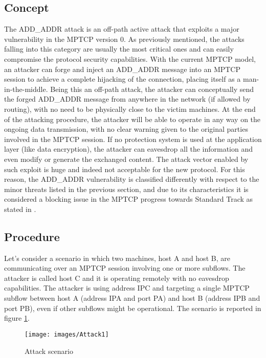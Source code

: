 \subsection{Concept}
The ADD\_ADDR attack is an off-path active attack that exploits a major vulnerability in the MPTCP version 0. As previously mentioned, the attacks falling into this category are usually the most critical ones and can easily compromise the protocol security capabilities.
With the current MPTCP model, an attacker can forge and inject an ADD\_ADDR message into an MPTCP session to achieve a complete hijacking of the connection, placing itself as a man-in-the-middle. Being this an off-path attack, the attacker can conceptually send the forged ADD\_ADDR message from anywhere in the network (if allowed by routing), with no need to be physically close to the victim machines. At the end of the attacking procedure, the attacker will be able to operate in any way on the ongoing data transmission, with no clear warning given to the original parties involved in the MPTCP session.
If no protection system is used at the application layer (like data encryption), the attacker can eavesdrop all the information and even modify or generate the exchanged content. The attack vector enabled by such exploit is huge and indeed not acceptable for the new protocol. For this reason, the ADD\_ADDR vulnerability is classified differently with respect to the minor threats listed in the previous section, and due to its characteristics it is considered a blocking issue in the MPTCP progress towards Standard Track as stated in .

\subsection{Procedure}
Let's consider a scenario in which two machines, host A and host B, are communicating over an MPTCP session involving one or more subflows. The attacker is called host C and it is operating remotely with no eavesdrop capabilities. The attacker is using address IPC and targeting a single MPTCP subflow between host A (address IPA and port PA) and host B (address IPB and port PB), even if other subflows might be operational. The scenario is reported in figure \ref{fig:attack1}.

\begin{figure}[!htb]
\centering
\texttt{[image: images/Attack1]}
\caption{Attack scenario}
\label{fig:attack1}
\end{figure}

